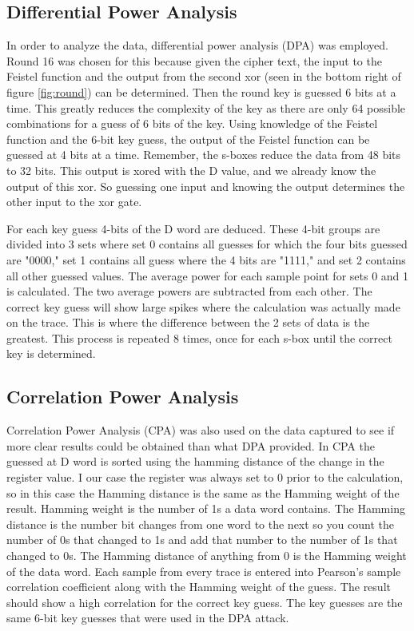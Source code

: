 \subsection{Differential Power Analysis}
	In order to analyze the data, differential power analysis (DPA) was employed.  Round 16 was chosen for this because given the cipher text, the input to the Feistel function and the output from the second xor (seen in the bottom right of figure \ref{fig:round}) can be determined.  Then the round key is guessed 6 bits at a time.  This greatly reduces the complexity of the key as there are only 64 possible combinations for a guess of 6 bits of the key.  Using knowledge of the Feistel function and the 6-bit key guess, the output of the Feistel function can be guessed at 4 bits at a time.  Remember, the s-boxes reduce the data from 48 bits to 32 bits.  This output is xored with the D value, and we already know the output of this xor.  So guessing one input and knowing the output determines the other input to the xor gate.  
	
	For each key guess 4-bits of the D word are deduced.  These 4-bit groups are divided into 3 sets where set 0 contains all guesses for which the four bits guessed are "0000," set 1 contains all guess where the 4 bits are "1111," and set 2 contains all other guessed values.  The average power for each sample point for sets 0 and 1 is calculated.  The two average powers are subtracted from each other.  The correct key guess will show large spikes where the calculation was actually made on the trace.  This is where the difference between the 2 sets of data is the greatest.  This process is repeated 8 times, once for each s-box until the correct key is determined.
	
\subsection{Correlation Power Analysis}
  Correlation Power Analysis (CPA) was also used on the data captured to see if more clear results could be obtained than what DPA provided.  In CPA the guessed at D word is sorted using the hamming distance of the change in the register value.  I our case the register was always set to 0 prior to the calculation, so in this case the Hamming distance is the same as the Hamming weight of the result.  Hamming weight is the number of 1s a data word contains.  The Hamming distance is the number bit changes from one word to the next so you count the number of 0s that changed to 1s and add that number to the number of 1s that changed to 0s.  The Hamming distance of anything from 0 is the Hamming weight of the data word.
  Each sample from every trace is entered into Pearson's sample correlation coefficient along with the Hamming weight of the guess.  The result should show a high correlation for the correct key guess.  The key guesses are the same 6-bit key guesses that were used in the DPA attack.

